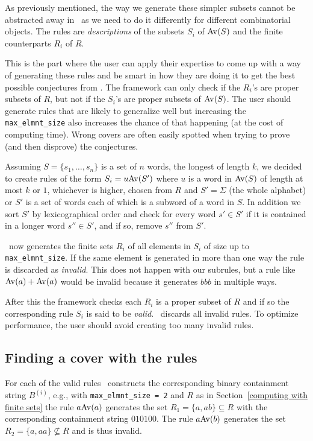 As previously mentioned, the way we generate these simpler subsets cannot be 
abstracted away in \CombCov\ as we need to do it differently for different 
combinatorial objects. The rules are \emph{descriptions} of the subsets $S_i$ 
of ${\mathrm{Av}\!\left(S\right)}$ and the finite counterparts $R_i$ of $R$.

This is the part where the user can apply their expertise to come up with a way 
of generating these rules and be  smart in how they are doing it to get the best 
possible conjectures from \CombCov. The framework can only check if the $R_i$'s 
are proper subsets of $R$, but not if the $S_i$'s are proper subsets of 
${\mathrm{Av}\!\left(S\right)}$. The user should generate rules that are likely to generalize well but 
increasing the \texttt{max\_elmnt\_size} also increases the chance of that 
happening (at the cost of computing time). Wrong covers are often easily spotted 
when trying to prove (and then disprove) the conjectures.

Assuming $S = \{ s_1, \ldots, s_n \}$ is a set of $n$ words, the longest of 
length $k$, we decided to create rules of the form $S_i = u {\mathrm{Av}\!\left(S'\right)}$ where $u$ 
is a word in ${\mathrm{Av}\!\left(S\right)}$ of length at most $k$ or $1$, whichever is higher, chosen 
from $R$ and $S' = \Sigma$ (the whole alphabet) or $S'$ is a set of words each 
of which is a subword of a word in $S$. In addition we sort $S'$ by lexicographical 
order and check for every word $s' \in S'$ if it is contained in a longer word 
$s'' \in S'$, and if so, remove $s''$ from $S'$. 

\CombCov\ now generates the finite sets $R_i$ of all elements in $S_i$ of size 
up to \texttt{max\_elmnt\_size}. If the same element is generated in more than 
one way the rule is discarded as \emph{invalid}. This does not happen with our 
subrules, but a rule like ${\mathrm{Av}\!\left(a\right)} + {\mathrm{Av}\!\left(a\right)}$ would be invalid because it 
generates $bbb$ in multiple ways.

After this the framework checks each $R_i$ is a proper subset of $R$ and if so 
the corresponding rule $S_i$ is said to be \emph{valid}. \CombCov\ discards all 
invalid rules. To optimize performance, the user should avoid creating too many 
invalid rules.


\subsection{Finding a cover with the rules}

For each of the valid rules \CombCov\ constructs the corresponding binary 
containment string $B^{(i)}$, e.g., with \texttt{max\_elmnt\_size = 2} and $R$ 
as in Section~\ref{computing with finite sets} the rule $a {\mathrm{Av}\!\left(a\right)}$ generates 
the set $R_1 = \{ a, ab \} \subseteq R$ with the corresponding containment 
string $010100$. The rule $a {\mathrm{Av}\!\left(b\right)}$ generates the set $R_2 = \{ a, aa \} \not 
\subseteq R$ and is thus invalid.

